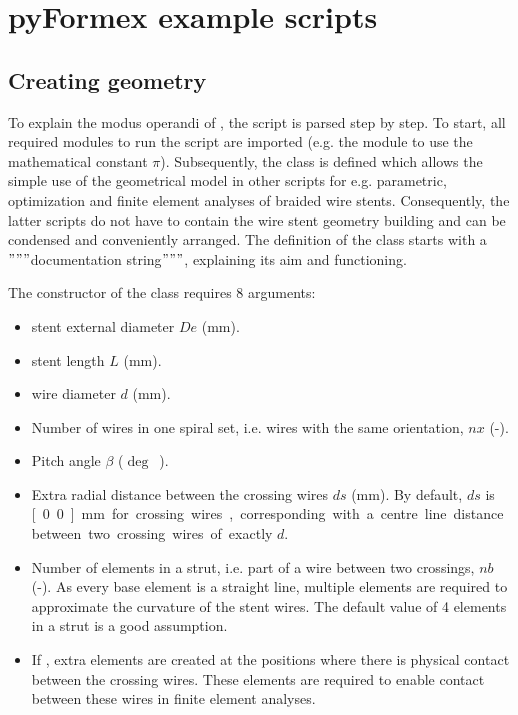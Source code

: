 
\chapter{pyFormex example scripts}
\label{cha:examples}

\section{Creating geometry}
\label{sec:creating-geometry}

To explain the modus operandi of \pyf, the  script is parsed step by step. To start, all required modules to run the  script are imported (e.g. the  module to use the mathematical constant $\pi$). Subsequently, the class  is defined which allows the simple use of the geometrical model in other scripts for e.g. parametric, optimization and finite element analyses of braided wire stents. Consequently, the latter scripts do not have to contain the wire stent geometry building and can be condensed and conveniently arranged. The definition of the class starts with a $"""$documentation string$"""$, explaining its aim and functioning.



The constructor  of the  class requires 8 arguments:
\begin{itemize}
\item stent external diameter $De$ (\unit{mm}).
\item stent length $L$ (\unit{mm}).
\item wire diameter $d$ (\unit{mm}).
\item Number of wires in one spiral set, i.e. wires with the same orientation, $nx$ (\unit{-}).
\item Pitch angle $\beta$ (\unit{$\deg$}).
\item Extra radial distance between the crossing wires $ds$ (\unit{mm}). By default, $ds$ is \unit[0.0]{mm} for crossing wires, corresponding with a centre line distance between two crossing wires of exactly $d$.
\item Number of elements in a strut, i.e. part of a wire between two crossings, $nb$ (\unit{-}). As every base element is a straight line, multiple elements are required to approximate the curvature of the stent wires. The default value of 4 elements in a strut is a good assumption.
\item If , extra elements are created at the positions where there is physical contact between the crossing wires. These elements are required to enable contact between these wires in finite element analyses.
\end{itemize}

